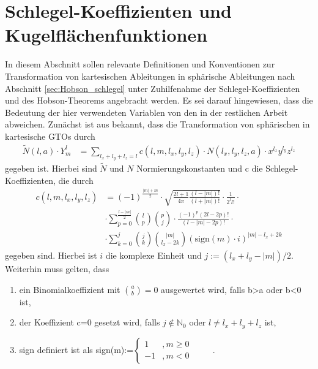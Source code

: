 \chapter{Schlegel-Koeffizienten und Kugelflächenfunktionen}
\label{sec:AnhangA:Schlegel}
In diesem Abschnitt sollen relevante Definitionen und 
Konventionen zur Transformation von kartesischen Ableitungen 
in sphärische Ableitungen nach Abschnitt 
\ref{sec:Hobson_schlegel} unter Zuhilfenahme der 
Schlegel-Koeffizienten und  des Hobson-Theorems angebracht 
werden. Es sei darauf hingewiesen, dass die Bedeutung der 
hier verwendeten Variablen von den in der restlichen Arbeit abweichen.  
Zunächst ist aus \cite{av:4a} bekannt, dass die 
Transformation von sphärischen in kartesische GTOs durch 
%
\begin{align}%
\tilde{N}(l,a)\cdot Y^l_m 
&=\sum_{l_x+l_y+l_z=l}^{} c(l,m,l_x,l_y,l_z)\cdot 
N(l_x,l_y,l_z,a)\cdot x^{l_x}y^{l_y}z^{l_z}
\end{align}
%
gegeben ist. Hierbei sind $\tilde{N}$ und $N$ 
Normierungskonstanten und c die Schlegel-Koeffizienten, die 
durch
%
\begin{align}\nonumber
c(l,m,l_x,l_y,l_z)&=(-1)^{\frac{|m|+m}{2}}\cdot 
\sqrt{\frac{2l+1}{4\pi}\frac{(l-|m|)!}{(l+|m|)!}}\cdot 
\frac{1}{2^ll!}\cdot \\\nonumber
&\cdot 
\sum_{p=0}^{\frac{l-|m|}{2}}\binom{l}{p}\binom{p}{j}\cdot 
\frac{(-1)^p(2l-2p)!}{(l-|m|-2p)!}\cdot\\
&\cdot 
\sum_{k=0}^{j}\binom{j}{k}\binom{|m|}{l_x-2k}(\text{sign}(m)\cdot
 i)^{|m|-l_x+2k}
\end{align}
%
%
gegeben sind. Hierbei ist $i$ die komplexe Einheit und 
$j:=(l_x+l_y-|m|)/2$. Weiterhin muss gelten, dass 
\begin{enumerate}
	\item ein 
	Binomialkoeffizient mit $\binom{a}{b}=0$ ausgewertet wird, falls b>a oder 
	b<0	ist,
	\item der Koeffizient c=0 gesetzt wird, falls $j\notin\mathbb{N}_0$ 
	oder $l\neq l_x+l_y+l_z$ ist,
	\item sign definiert ist als sign(m):=$\begin{cases}
	1 & , m\geq0\\
	-1 & , m<0
	\end{cases}\qquad$ .
\end{enumerate}
